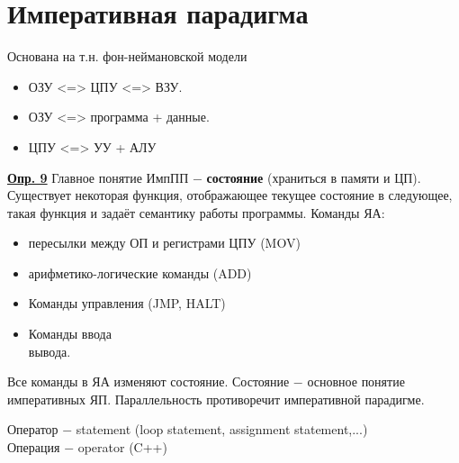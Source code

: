 \documentclass[a4paper, 12pt, titlepage, finall]{extreport}
\begin{document}
    \chapter{Императивная парадигма}
        Основана на т.н. фон-неймановской модели
        \begin{itemize}
            \item ОЗУ <=> ЦПУ <=> ВЗУ.
            \item ОЗУ <=> программа + данные.
            \item ЦПУ <=> УУ + АЛУ
        \end{itemize}
        \underline{\bf Опр. 9} Главное понятие ИмпПП $-$ {\bf состояние} (храниться в памяти и ЦП).\\
        Существует некоторая функция, отображающее текущее состояние в следующее, такая функция и задаёт семантику работы программы.
        Команды ЯА:
        \begin{itemize}
            \item пересылки между ОП и регистрами ЦПУ (MOV)
            \item арифметико-логические команды (ADD)
            \item Команды управления (JMP, HALT)
            \item Команды ввода\\вывода.
        \end{itemize}
        Все команды в ЯА изменяют состояние. Состояние $-$ основное понятие императивных ЯП.
        Параллельность противоречит императивной парадигме.

        Оператор $-$ statement (loop statement, assignment statement,...)\\
        Операция $-$ operator (C++)\\
        
\end{document}
